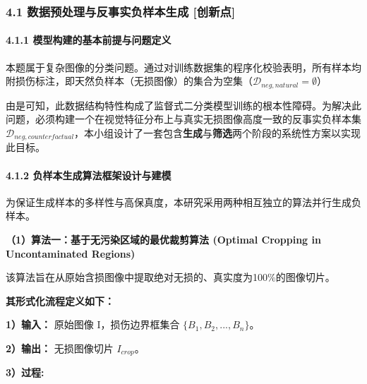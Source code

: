 \documentclass[
]{article}
\begin{document}
\subsubsection{\texorpdfstring{\textbf{4.1 数据预处理与反事实负样本生成
{[}创新点{]}}}{4.1 数据预处理与反事实负样本生成 {[}创新点{]}}}\label{41-ux6570ux636eux9884ux5904ux7406ux4e0eux53cdux4e8bux5b9eux8d1fux6837ux672cux751fux6210-ux521bux65b0ux70b9}

\paragraph{4.1.1
模型构建的基本前提与问题定义}\label{411-ux6a21ux578bux6784ux5efaux7684ux57faux672cux524dux63d0ux4e0eux95eeux9898ux5b9aux4e49}

本题属于复杂图像的分类问题。通过对训练数据集的程序化校验表明，所有样本均附损伤标注，即天然负样本（无损图像）的集合为空集（\(\mathcal{D}_{neg, natural} = \emptyset\)）

由是可知，此数据结构特性构成了监督式二分类模型训练的根本性障碍。为解决此问题，必须构建一个在视觉特征分布上与真实无损图像高度一致的反事实负样本集
\(\mathcal{D}_{neg, counterfactual}\)，本小组设计了一套包含\textbf{生成}与\textbf{筛选}两个阶段的系统性方案以实现此目标。

\paragraph{\texorpdfstring{4.1.2
\textbf{负样本生成算法框架}设计与建模}{4.1.2 负样本生成算法框架设计与建模}}\label{412-ux8d1fux6837ux672cux751fux6210ux7b97ux6cd5ux6846ux67b6ux8bbeux8ba1ux4e0eux5efaux6a21}

为保证生成样本的多样性与高保真度，本研究采用两种相互独立的算法并行生成负样本。

\textbf{（1）算法一：基于无污染区域的最优裁剪算法 (Optimal Cropping in
Uncontaminated Regions)}

该算法旨在从原始含损图像中提取绝对无损的、真实度为100\%的图像切片。

\textbf{其形式化流程定义如下：}

\textbf{1）输入：} 原始图像 I，损伤边界框集合
\(\{B_1, B_2, ..., B_n\}\)。

\textbf{2）输出：} 无损图像切片 \(I_{crop}\)。

\textbf{3）过程:}
\end{document}
